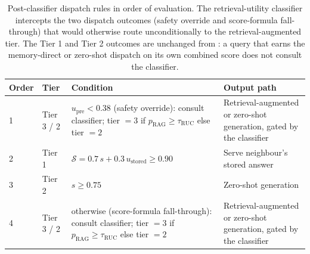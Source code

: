 \begin{table}[!htbp]
\centering
\small
\begin{tabular}{@{}p{0.6cm}p{1.0cm}p{6.5cm}p{4.5cm}@{}}
\toprule
\textbf{Order} & \textbf{Tier} & \textbf{Condition} & \textbf{Output path} \\
\midrule
1 & Tier 3 / 2 & $u_{\text{pre}} < 0.38$ (safety override): consult classifier; tier $= 3$ if $p_{\text{RAG}} \ge \tau_{\text{RUC}}$ else tier $= 2$ & Retrieval-augmented or zero-shot generation, gated by the classifier \\
2 & Tier 1 & $\mathcal{S} = 0.7\,s + 0.3\,u_{\text{stored}} \ge 0.90$ & Serve neighbour's stored answer \\
3 & Tier 2 & $s \ge 0.75$ & Zero-shot generation \\
4 & Tier 3 / 2 & otherwise (score-formula fall-through): consult classifier; tier $= 3$ if $p_{\text{RAG}} \ge \tau_{\text{RUC}}$ else tier $= 2$ & Retrieval-augmented or zero-shot generation, gated by the classifier \\
\bottomrule
\end{tabular}
\caption[Post-classifier dispatch rules in order of evaluation.]{Post-classifier dispatch rules in order of evaluation. The retrieval-utility classifier intercepts the two dispatch outcomes (safety override and score-formula fall-through) that would otherwise route unconditionally to the retrieval-augmented tier. The Tier 1 and Tier 2 outcomes are unchanged from : a query that earns the memory-direct or zero-shot dispatch on its own combined score does not consult the classifier.}
\label{tab:ruc-dispatch}
\end{table}

